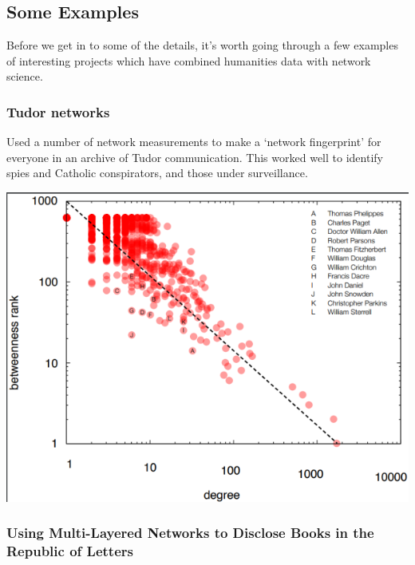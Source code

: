 \documentclass[
]{book}
\begin{document}
\hypertarget{some-examples}{%
\subsection{Some Examples}\label{some-examples}}

Before we get in to some of the details, it's worth going through a few examples of interesting projects which have combined humanities data with network science.

\hypertarget{tudor-networks}{%
\subsubsection{Tudor networks}\label{tudor-networks}}

Used a number of network measurements to make a `network fingerprint' for everyone in an archive of Tudor communication. This worked well to identify spies and Catholic conspirators, and those under surveillance.

\includegraphics{images/Screenshot 2022-10-03 at 11.42.11.png}

\hypertarget{using-multi-layered-networks-to-disclose-books-in-the-republic-of-letters}{%
\subsubsection{\texorpdfstring{\textbf{Using Multi-Layered Networks to Disclose Books in the Republic of Letters}}{Using Multi-Layered Networks to Disclose Books in the Republic of Letters}}\label{using-multi-layered-networks-to-disclose-books-in-the-republic-of-letters}}
\end{document}
